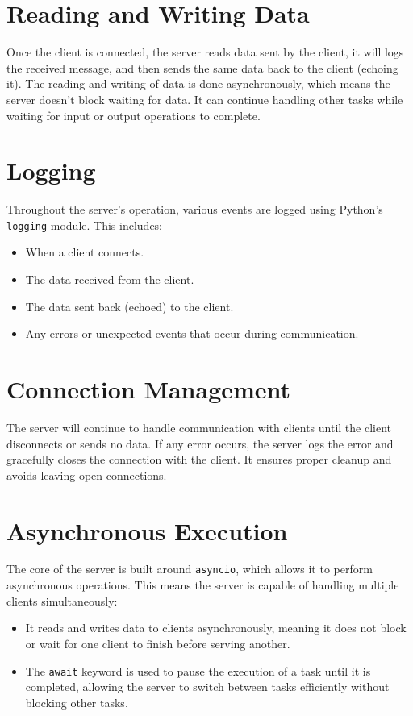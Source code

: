 \documentclass{exam}
\begin{document}
\section*{Reading and Writing Data}
Once the  client is connected, the server reads data sent by the client, it will logs the received message, and then sends the same data back to the client (echoing it). 
The reading and writing of data is done asynchronously, which means the server doesn’t block waiting for data. It can continue handling other tasks while waiting for input or output operations to complete.

\section*{Logging}
Throughout the server's operation, various events are logged using Python's \texttt{logging} module. This includes:
\begin{itemize}
    \item When a client connects.
    \item The data received from the client.
    \item The data sent back (echoed) to the client.
    \item Any errors or unexpected events that occur during communication.
\end{itemize}

\section*{Connection Management}
The server will continue to handle communication with clients until the client disconnects or sends no data. If any error occurs, the server logs the error and gracefully closes the connection with the client. It ensures proper cleanup and avoids leaving open connections.

\section*{Asynchronous Execution}
The core of the server is built around \texttt{asyncio}, which allows it to perform asynchronous operations. This means the server is capable of handling multiple clients simultaneously:
\begin{itemize}
    \item It reads and writes data to clients asynchronously, meaning it does not block or wait for one client to finish before serving another.
    \item The \texttt{await} keyword is used to pause the execution of a task until it is completed, allowing the server to switch between tasks efficiently without blocking other tasks.
\end{itemize}
\end{document}
